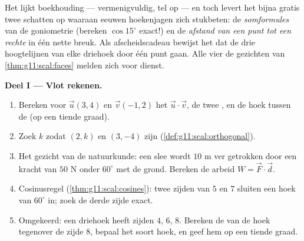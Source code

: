 \begin{problem}
\label{pb:g11:scal:1}
Het  lijkt boekhouding --- vermenigvuldig, tel op --- en toch
levert het bijna gratis twee schatten op waaraan eeuwen hoekenjagen zich
stukbeten: de \emph{somformules} van de goniometrie (bereken $\cos 15^\circ$
exact!) en de \emph{afstand van een punt tot een rechte} in één nette breuk.
Als afscheidscadeau bewijst het dat de drie hoogtelijnen van elke driehoek
door één punt gaan. Alle vier de gezichten van \cref{thm:g11:scal:faces}
melden zich voor dienst.

\medskip
\noindent\textbf{Deel I --- Vlot rekenen.}
\begin{enumerate}
  \item Bereken voor $\vec u(3, 4)$ en $\vec v(-1, 2)$ het 
        $\vec u \cdot \vec v$, de twee , en de hoek tussen de 
        (op een tiende graad).
  \item Zoek $k$ zodat $(2, k)$ en $(3, -4)$  zijn
        (\cref{def:g11:scal:orthogonal}).
  \item Het gezicht van de natuurkunde: een slee wordt $10$ m ver getrokken
        door een kracht van $50$ N onder $60^\circ$ met de grond. Bereken de
        arbeid $W = \vec F \cdot \vec d$.
  \item Cosinusregel (\cref{thm:g11:scal:cosines}): twee zijden van $5$ en
        $7$ sluiten een hoek van $60^\circ$ in; zoek de derde zijde exact.
  \item Omgekeerd: een driehoek heeft zijden $4$, $6$, $8$. Bereken de
         van de hoek tegenover de zijde $8$, bepaal het soort hoek, en
        geef hem op een tiende graad.
\end{enumerate}


\end{problem}
